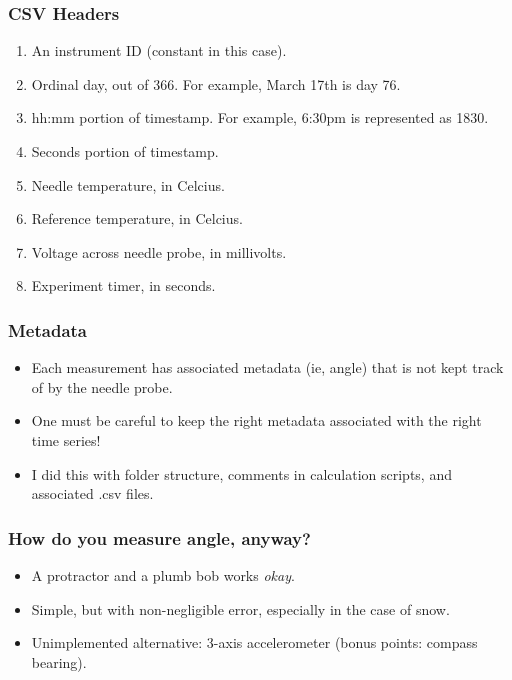 \documentclass{beamer}
\begin{document}
\begin{frame}
\frametitle{CSV Headers}
\begin{enumerate}
\item An instrument ID (constant in this case).
\item Ordinal day, out of 366. For example, March 17th is day 76.
\item hh:mm portion of timestamp. For example, 6:30pm is represented as 1830.
\item Seconds portion of timestamp.
\item Needle temperature, in Celcius.
\item Reference temperature, in Celcius.
\item Voltage across needle probe, in millivolts.
\item Experiment timer, in seconds.
\end{enumerate}
\end{frame}


\begin{frame}
\frametitle{Metadata}
\begin{itemize}
\item Each measurement has associated metadata (ie, angle) that is not kept
track of by the needle probe.
\item One must be careful to keep the right metadata associated with the right
time series!
\item I did this with folder structure, comments in calculation scripts, and associated .csv files.
\end{itemize}
\end{frame}


\begin{frame}
\frametitle{How do you measure angle, anyway?}
\begin{itemize}
\item A protractor and a plumb bob works \emph{okay}.
\item Simple, but with non-negligible error, especially in the case of snow.
\item Unimplemented alternative: 3-axis accelerometer (bonus points: compass bearing).
\end{itemize}
\end{frame}
\end{document}
